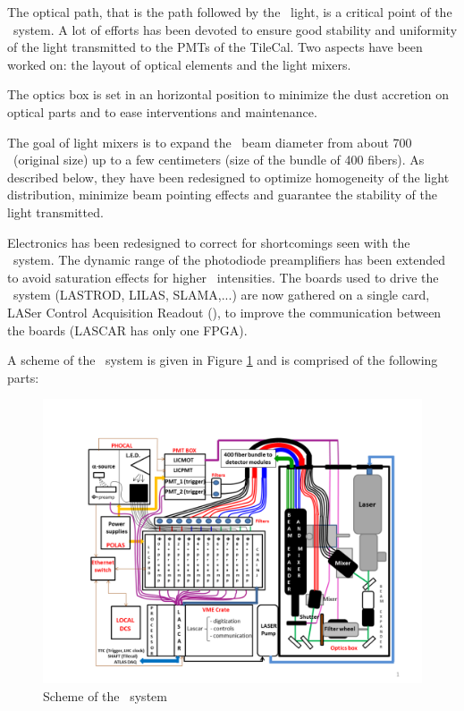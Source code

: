 \par
The optical path, that is the path followed by the \laser~light, is a critical point of the \lasii~system. A lot of efforts has been devoted to ensure good stability and uniformity of the light transmitted to the PMTs of the TileCal. Two aspects have been worked on: the layout of optical elements and the light mixers. \par
The optics box is set in an horizontal position to minimize the dust accretion on optical parts and to ease interventions and maintenance. \par
The goal of light mixers is to expand the \laser~beam diameter from about 700 \mum~(original size) up to a few centimeters (size of the bundle of 400 fibers). As described below, they have been redesigned to optimize homogeneity of the light distribution, minimize beam pointing effects and  guarantee the stability of the light transmitted.
\par
Electronics has been redesigned to correct for shortcomings seen with the \lasi~system. The dynamic range of the photodiode preamplifiers has been extended to avoid saturation effects for higher \laser~intensities. The boards used to drive the \lasi~system (LASTROD, LILAS, SLAMA,...) are now gathered on a single card, LASer Control Acquisition Readout (\lascar), to improve the communication between the boards (LASCAR has only one FPGA).
\par
A scheme of the \lasii~system is given in Figure \ref{fig:laserscheme} and is comprised of the following parts:
\begin{figure}[htbp]
\centering
\includegraphics[width=15cm]{figures/layout_laserII_new.pdf}
\caption{Scheme of the \lasii~system}\label{fig:laserscheme}
\end{figure}
